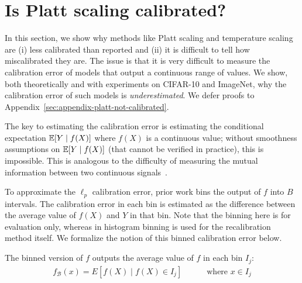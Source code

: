 \section{Is Platt scaling calibrated?}
\label{sec:challenges-measuring}

In this section, we show why methods like Platt scaling and temperature scaling are (i) less calibrated than reported and (ii) it is difficult to tell how miscalibrated they are. The issue is that it is very difficult to measure the calibration error of models that output a continuous range of values. We show, both theoretically and with experiments on CIFAR-10 and ImageNet, why the calibration error of such models is \emph{underestimated}.
We defer proofs to Appendix~\ref{sec:appendix-platt-not-calibrated}.

The key to estimating the calibration error is estimating the conditional expectation $\mathbb{E}[Y \mid f(X)]$ where $f(X)$ is a continuous value; without smoothness assumptions on $\mathbb{E}[Y \mid f(X)]$ (that cannot be verified in practice), this is impossible. This is analogous to the difficulty of measuring the mutual information between two continuous signals~\cite{paninski2003entropy}.

To approximate the $\ell_p$ calibration error, prior work bins the output of $f$ into $B$ intervals.
The calibration error in each bin is estimated as the difference between the average value of $f(X)$ and $Y$ in that bin.
Note that the binning here is for evaluation only, whereas in histogram binning is used for the recalibration method itself.
We formalize the notion of this binned calibration error below.


\begin{definition}
The binned version of $f$ outputs the average value of $f$ in each bin $I_j$:
\begin{align}
f_{\mathcal{B}}(x) = E[f(X) \mid f(X) \in I_j] \quad\quad\quad \mbox{where }x \in I_j
\end{align} 
\end{definition}

